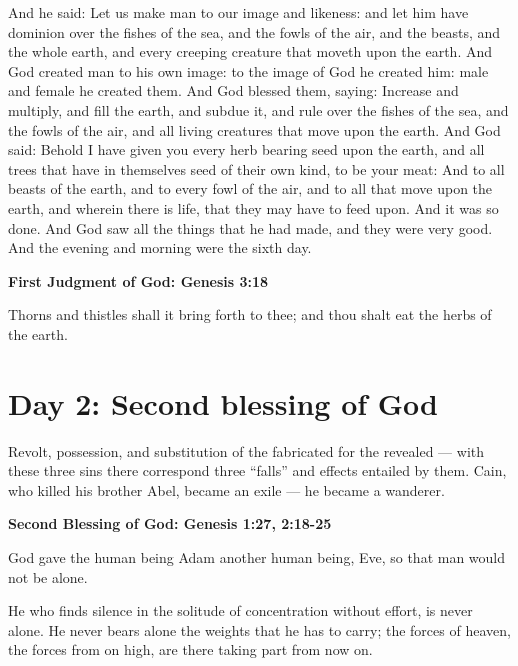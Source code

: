 And he said: Let us make man to our image and likeness: and let him have dominion over the fishes of the sea, and the fowls of the air, and the beasts, and the whole earth, and every creeping creature that moveth upon the earth. And God created man to his own image: to the image of God he created him: male and female he created them. And God blessed them, saying: Increase and multiply, and fill the earth, and subdue it, and rule over the fishes of the sea, and the fowls of the air, and all living creatures that move upon the earth. And God said: Behold I have given you every herb bearing seed upon the earth, and all trees that have in themselves seed of their own kind, to be your meat: And to all beasts of the earth, and to every fowl of the air, and to all that move upon the earth, and wherein there is life, that they may have to feed upon. And it was so done. And God saw all the things that he had made, and they were very good. And the evening and morning were the sixth day.

\textbf{First Judgment of God: Genesis 3:18}

Thorns and thistles shall it bring forth to thee; and thou shalt eat the herbs of the earth.

\section{Day 2: Second blessing of God}

\begin{quotex}
Revolt, possession, and substitution of the fabricated for the revealed — with these three sins
there correspond three ``falls'' and effects entailed by them. Cain, who killed his brother Abel, became an exile — he became a wanderer. 

\end{quotex}

\textbf{Second Blessing of God: Genesis 1:27, 2:18-25}

God gave the human being Adam another human being, Eve, so that man would not be alone.

\begin{quotex}
He who finds silence in the solitude of concentration without effort, is never alone. He never bears alone the weights that he has to carry; the forces of heaven, the forces from on high, are there taking part from now on. 

\end{quotex}


